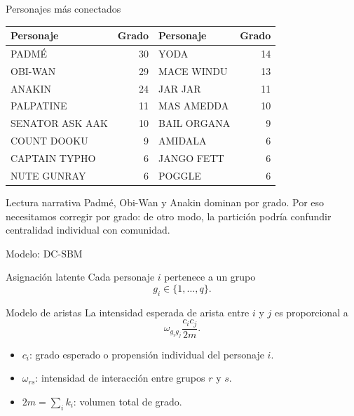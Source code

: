 \documentclass[aspectratio=169,11pt]{beamer}
\begin{document}
\begin{frame}{Personajes más conectados}
\centering
\begin{tabular}{lr@{\qquad}lr}
\toprule
Personaje & Grado & Personaje & Grado\\
\midrule
PADMÉ & 30 & YODA & 14\\
OBI-WAN & 29 & MACE WINDU & 13\\
ANAKIN & 24 & JAR JAR & 11\\
PALPATINE & 11 & MAS AMEDDA & 10\\
SENATOR ASK AAK & 10 & BAIL ORGANA & 9\\
COUNT DOOKU & 9 & AMIDALA & 6\\
CAPTAIN TYPHO & 6 & JANGO FETT & 6\\
NUTE GUNRAY & 6 & POGGLE & 6\\
\bottomrule
\end{tabular}

\vspace{0.4cm}

\begin{block}{Lectura narrativa}
Padmé, Obi-Wan y Anakin dominan por grado. Por eso necesitamos corregir por grado: de otro modo, la partición podría confundir centralidad individual con comunidad.
\end{block}
\end{frame}

\begin{frame}{Modelo: DC-SBM}
\begin{block}{Asignación latente}
Cada personaje $i$ pertenece a un grupo
\[
g_i\in\{1,\ldots,q\}.
\]
\end{block}

\begin{block}{Modelo de aristas}
La intensidad esperada de arista entre $i$ y $j$ es proporcional a
\[
\omega_{g_i g_j}\frac{c_i c_j}{2m}.
\]
\end{block}

\begin{itemize}
    \item $c_i$: grado esperado o propensión individual del personaje $i$.
    \item $\omega_{rs}$: intensidad de interacción entre grupos $r$ y $s$.
    \item $2m=\sum_i k_i$: volumen total de grado.
\end{itemize}
\end{frame}
\end{document}
